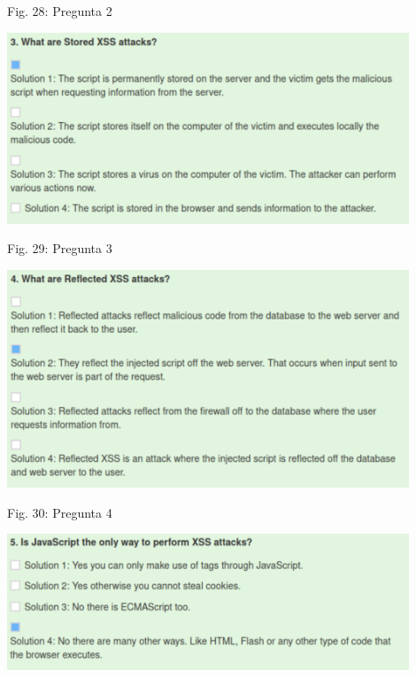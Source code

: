 \documentclass[12pt,oneside,a4paper]{book}
\begin{document}
\begin{enumerate}
\begin{enumerate}
\begin{center}
            Fig. 28: Pregunta 2
        \end{center}
        
        \vspace{2em}

        \begin{center}
            \includegraphics[width=12cm]{img/xss15.png}
            
            \vspace{0.1em}
            
            Fig. 29: Pregunta 3
        \end{center}
        
        \vspace{2em}

        \begin{center}
            \includegraphics[width=12cm]{img/xss16.png}
            
            \vspace{0.1em}
            
            Fig. 30: Pregunta 4
        \end{center}
        
        \vspace{2em}

        \begin{center}
            \includegraphics[width=12cm]{img/xss17.png}
            

\end{center}
\end{enumerate}
\end{enumerate}
\end{document}
